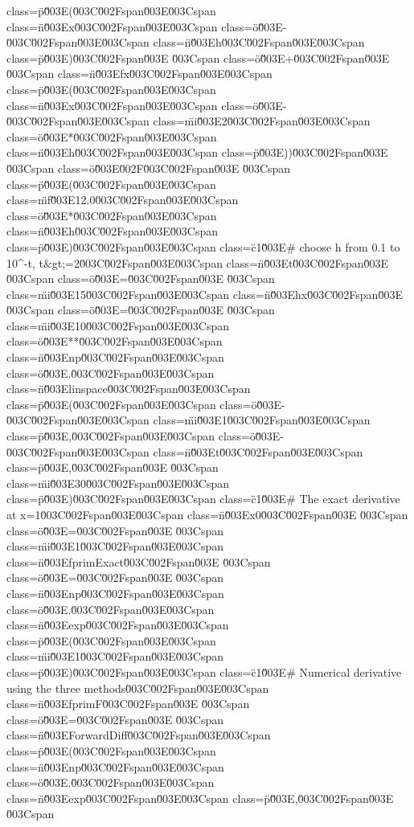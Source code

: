 class=\"p\"\u003E(\u003C\u002Fspan\u003E\u003Cspan class=\"n\"\u003Ex\u003C\u002Fspan\u003E\u003Cspan class=\"o\"\u003E-\u003C\u002Fspan\u003E\u003Cspan class=\"n\"\u003Eh\u003C\u002Fspan\u003E\u003Cspan class=\"p\"\u003E)\u003C\u002Fspan\u003E \u003Cspan class=\"o\"\u003E+\u003C\u002Fspan\u003E \u003Cspan class=\"n\"\u003Efx\u003C\u002Fspan\u003E\u003Cspan class=\"p\"\u003E(\u003C\u002Fspan\u003E\u003Cspan class=\"n\"\u003Ex\u003C\u002Fspan\u003E\u003Cspan class=\"o\"\u003E-\u003C\u002Fspan\u003E\u003Cspan class=\"mi\"\u003E2\u003C\u002Fspan\u003E\u003Cspan class=\"o\"\u003E*\u003C\u002Fspan\u003E\u003Cspan class=\"n\"\u003Eh\u003C\u002Fspan\u003E\u003Cspan class=\"p\"\u003E))\u003C\u002Fspan\u003E \u003Cspan class=\"o\"\u003E\u002F\u003C\u002Fspan\u003E \u003Cspan class=\"p\"\u003E(\u003C\u002Fspan\u003E\u003Cspan class=\"mf\"\u003E12.0\u003C\u002Fspan\u003E\u003Cspan class=\"o\"\u003E*\u003C\u002Fspan\u003E\u003Cspan class=\"n\"\u003Eh\u003C\u002Fspan\u003E\u003Cspan class=\"p\"\u003E)\u003C\u002Fspan\u003E\n\n\u003Cspan class=\"c1\"\u003E# choose h from 0.1 to 10^-t, t&gt;=2\u003C\u002Fspan\u003E\n\u003Cspan class=\"n\"\u003Et\u003C\u002Fspan\u003E \u003Cspan class=\"o\"\u003E=\u003C\u002Fspan\u003E \u003Cspan class=\"mi\"\u003E15\u003C\u002Fspan\u003E\n\u003Cspan class=\"n\"\u003Ehx\u003C\u002Fspan\u003E \u003Cspan class=\"o\"\u003E=\u003C\u002Fspan\u003E \u003Cspan class=\"mi\"\u003E10\u003C\u002Fspan\u003E\u003Cspan class=\"o\"\u003E**\u003C\u002Fspan\u003E\u003Cspan class=\"n\"\u003Enp\u003C\u002Fspan\u003E\u003Cspan class=\"o\"\u003E.\u003C\u002Fspan\u003E\u003Cspan class=\"n\"\u003Elinspace\u003C\u002Fspan\u003E\u003Cspan class=\"p\"\u003E(\u003C\u002Fspan\u003E\u003Cspan class=\"o\"\u003E-\u003C\u002Fspan\u003E\u003Cspan class=\"mi\"\u003E1\u003C\u002Fspan\u003E\u003Cspan class=\"p\"\u003E,\u003C\u002Fspan\u003E\u003Cspan class=\"o\"\u003E-\u003C\u002Fspan\u003E\u003Cspan class=\"n\"\u003Et\u003C\u002Fspan\u003E\u003Cspan class=\"p\"\u003E,\u003C\u002Fspan\u003E \u003Cspan class=\"mi\"\u003E30\u003C\u002Fspan\u003E\u003Cspan class=\"p\"\u003E)\u003C\u002Fspan\u003E\n\n\u003Cspan class=\"c1\"\u003E# The exact derivative at x=1\u003C\u002Fspan\u003E\n\u003Cspan class=\"n\"\u003Ex0\u003C\u002Fspan\u003E \u003Cspan class=\"o\"\u003E=\u003C\u002Fspan\u003E \u003Cspan class=\"mi\"\u003E1\u003C\u002Fspan\u003E\n\u003Cspan class=\"n\"\u003EfprimExact\u003C\u002Fspan\u003E \u003Cspan class=\"o\"\u003E=\u003C\u002Fspan\u003E \u003Cspan class=\"n\"\u003Enp\u003C\u002Fspan\u003E\u003Cspan class=\"o\"\u003E.\u003C\u002Fspan\u003E\u003Cspan class=\"n\"\u003Eexp\u003C\u002Fspan\u003E\u003Cspan class=\"p\"\u003E(\u003C\u002Fspan\u003E\u003Cspan class=\"mi\"\u003E1\u003C\u002Fspan\u003E\u003Cspan class=\"p\"\u003E)\u003C\u002Fspan\u003E\n\n\u003Cspan class=\"c1\"\u003E# Numerical derivative using the three methods\u003C\u002Fspan\u003E\n\u003Cspan class=\"n\"\u003EfprimF\u003C\u002Fspan\u003E \u003Cspan class=\"o\"\u003E=\u003C\u002Fspan\u003E \u003Cspan class=\"n\"\u003EForwardDiff\u003C\u002Fspan\u003E\u003Cspan class=\"p\"\u003E(\u003C\u002Fspan\u003E\u003Cspan class=\"n\"\u003Enp\u003C\u002Fspan\u003E\u003Cspan class=\"o\"\u003E.\u003C\u002Fspan\u003E\u003Cspan class=\"n\"\u003Eexp\u003C\u002Fspan\u003E\u003Cspan class=\"p\"\u003E,\u003C\u002Fspan\u003E \u003Cspan 